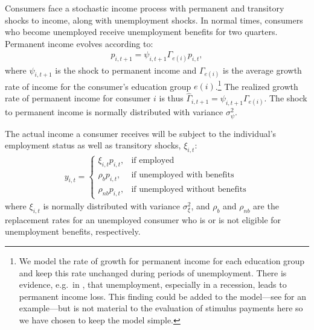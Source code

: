 \documentclass[\econtexRoot/EGMN]{subfiles}
\begin{document}
Consumers face a stochastic income process with permanent and transitory shocks to income, along with unemployment shocks. In normal times, consumers who become unemployed receive unemployment benefits for two quarters. Permanent income evolves according to:
\begin{align}
    p_{i,t+1} = \psi_{i,t+1}\Gamma_{e(i)}p_{i,t},
\end{align}
where $\psi_{i,t+1}$ is the shock to permanent income and $\Gamma_{e(i)}$ is the average growth rate of income for the consumer's education group $e(i)$.\footnote{We model the rate of growth for permanent income for each education group and keep this rate unchanged during periods of unemployment. There is evidence, e.g.\ in \cite{davis_recessions_2011}, that unemployment, especially in a recession, leads to permanent income loss. This finding could be added to the model---see \citet{carroll2020modeling} for an example---but is not material to the evaluation of stimulus payments here so we have chosen to keep the model simple.  } The realized growth rate of permanent income for consumer $i$ is thus $\hat{\Gamma}_{i,t+1} = \psi_{i,t+1} \Gamma_{e(i)}$. The shock to permanent income is normally distributed with variance $\sigma_{\psi}^2$.

The actual income a consumer receives will be subject to the individual's employment status as well as transitory shocks, $\xi_{i,t}$:
\begin{align}
    y_{i,t} =   \begin{cases}
                    \xi_{i,t}p_{i,t},  & \text{if employed}                    \\
                    \rho_b p_{i,t},    & \text{if unemployed with benefits}    \\
                    \rho_{nb} p_{i,t}, & \text{if unemployed without benefits}
                \end{cases}
\end{align}
where $\xi_{i,t}$ is normally distributed with variance $\sigma_{\xi}^2$, and $\rho_b$ and $\rho_{nb}$ are the replacement rates for an unemployed consumer who is or is not eligible for unemployment benefits, respectively.
\end{document}
